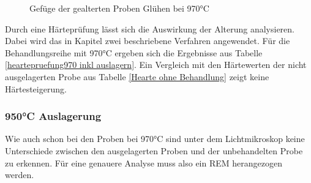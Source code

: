 \documentclass[a4paper, 11pt]{tubsreprt}
\begin{document}
\begin{figure}
\caption{Gefüge der gealterten Proben Glühen bei 970°C}
\label{REM 970C auslagerung}
\end{figure}


Durch eine Härteprüfung lässt sich die Auswirkung der Alterung analysieren. Dabei wird das in Kapitel zwei beschriebene Verfahren angewendet. Für die Behandlungsreihe mit 970°C ergeben sich die Ergebnisse aus Tabelle \ref{heartepruefung970 inkl auslagern}. Ein Vergleich mit den Härtewerten der nicht ausgelagerten Probe aus Tabelle \ref{Hearte ohne Behandlung} zeigt keine Härtesteigerung. 
\subsubsection{950°C Auslagerung}
Wie auch schon bei den Proben bei 970°C sind unter dem Lichtmikroskop keine Unterschiede zwischen den ausgelagerten Proben und der unbehandelten Probe zu erkennen. Für eine genauere Analyse muss also ein REM herangezogen werden.
\end{document}

